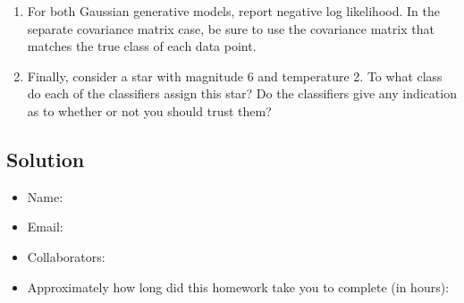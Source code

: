 \documentclass[submit]{harvardml}
\begin{document}
\begin{problem}
\begin{enumerate}
\item For both Gaussian generative models, report negative log
  likelihood. In the separate covariance matrix case, be sure to use
  the covariance matrix that matches the true class of each data
  point.

\item Finally, consider a star with magnitude 6 and temperature 2.
  To what class do each of the classifiers assign this star?  Do the
  classifiers give any indication as to whether or not you should
  trust them?

\end{enumerate}

\end{problem}

\subsection*{Solution}

\newpage

\begin{itemize}
    \item Name:
    \item Email:
    \item Collaborators:
    \item Approximately how long did this homework take you to complete (in hours):
\end{itemize}
\end{document}
